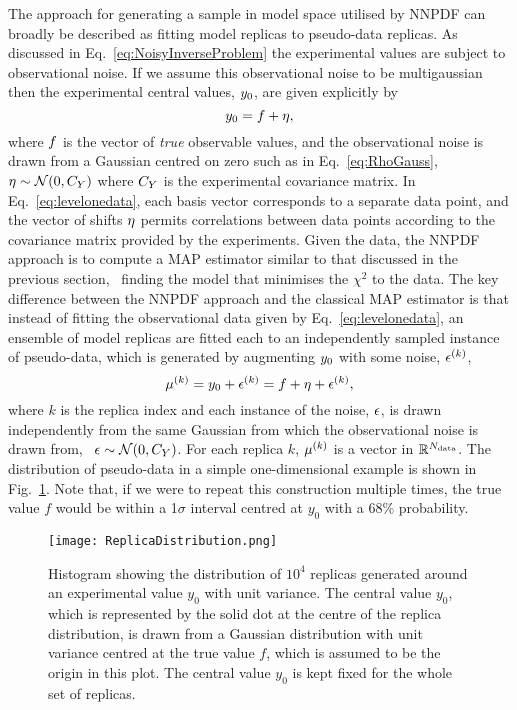 The approach for generating a sample in model space utilised by NNPDF can
broadly be described as fitting model replicas to pseudo-data replicas. As
discussed in Eq.~\eqref{eq:NoisyInverseProblem} the experimental values are
subject to observational noise. If we assume this observational noise to be
multigaussian then the experimental central values, $y_0$, are given
explicitly by
\begin{equation}
    \label{eq:levelonedata}
    y_0 = f + \eta,
\end{equation}
where $f$ is the vector of {\em true} observable values, and the observational
noise is drawn from a Gaussian centred on zero such as in
Eq.~\ref{eq:RhoGauss}, \ie\ $\eta \sim \mathcal{N}(0, C_{Y})$ where
$C_{Y}$ is the experimental covariance matrix. In
Eq.~\eqref{eq:levelonedata}, each basis vector corresponds to a separate data
point, and the vector of shifts $\eta$ permits correlations between data
points according to the covariance matrix provided by the experiments. Given the
data, the NNPDF approach is to compute a MAP estimator similar to that discussed
in the previous section, \ie\ finding the model that minimises the $\chi^2$ to
the data. The key difference between the NNPDF approach and the classical MAP
estimator is that instead of fitting the observational data given by
Eq.~\ref{eq:levelonedata}, an ensemble of model replicas are fitted each to an
independently sampled instance of pseudo-data, which is generated by augmenting
$y_0$ with some noise, $\epsilon^{(k)}$,
\begin{equation}
    \label{eq:leveltwodata1}
    \mu^{(k)} = y_0 + \epsilon^{(k)}
    = f + \eta + \epsilon^{(k)},
\end{equation}
where $k$ is the replica index and each instance of the noise, $\epsilon$, is
drawn independently from the same Gaussian from which the observational noise is
drawn from, \ie\ $\epsilon \sim \mathcal{N}(0, C_{Y})$. For each replica $k$, 
$\mu^{(k)}$ is a vector in $\mathbb{R}^{N_{\rm data}}$. The distribution of 
pseudo-data in a simple
one-dimensional example is shown in Fig.~\ref{fig:DistRep}. Note that, if we
were to repeat this construction multiple times, the true value $f$ would be
within a 1$\sigma$ interval centred at $y_0$ with a 68\% probability.
\begin{figure}
    \centering
    \texttt{[image: ReplicaDistribution.png]}
    \caption{Histogram showing the distribution of $10^4$ replicas generated around 
    an experimental value $y_0$ with unit variance. The central value $y_0$, which 
    is represented by the solid dot at the centre of the replica distribution, 
    is drawn from a Gaussian distribution with unit variance centred at the true 
    value $f$, which is assumed to be the origin in this plot. The central value 
    $y_0$ is kept fixed for the whole set of replicas.\label{fig:DistRep}}
\end{figure}

